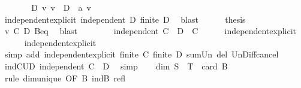 \begin{isabellebody}
\ \ \ \ \isamarkupfalse%
\ \isamarkupfalse%
\ D{}{\isacharcolon}{\kern0pt}\ {\isachardoublequoteopen}{\isasymAnd}v{\isachardot}{\kern0pt}\ v\ {\isasymin}\ D\ {\isasymLongrightarrow}\ a\ v\ {\isacharequal}{\kern0pt}\ {}{\isachardoublequoteclose}\isanewline
\ \ \ \ \ \ \isamarkupfalse%
\ independent{\isacharunderscore}{\kern0pt}explicit\ {\isacartoucheopen}independent\ D{\isacartoucheclose}\ {\isacartoucheopen}finite\ D{\isacartoucheclose}\ \isamarkupfalse%
\ blast\isanewline
\ \ \ \ \isamarkupfalse%
\ {\isacharquery}{\kern0pt}thesis\isanewline
\ \ \ \ \ \ \isamarkupfalse%
\ v\ C{}\ D{}\ Beq\ \isamarkupfalse%
\ blast\isanewline
\ \ \isamarkupfalse%
\isanewline
\ \ \isamarkupfalse%
\ \isamarkupfalse%
\ {\isachardoublequoteopen}independent\ {\isacharparenleft}{\kern0pt}C\ {\isasymunion}\ {\isacharparenleft}{\kern0pt}D\ {\isacharminus}{\kern0pt}\ C{\isacharparenright}{\kern0pt}{\isacharparenright}{\kern0pt}{\isachardoublequoteclose}\isanewline
\ \ \ \ \isamarkupfalse%
\ independent{\isacharunderscore}{\kern0pt}explicit\isanewline
\ \ \ \ \isamarkupfalse%
\ independent{\isacharunderscore}{\kern0pt}explicit\isanewline
\ \ \ \ \isamarkupfalse%
\ {\isacharparenleft}{\kern0pt}simp\ add{\isacharcolon}{\kern0pt}\ independent{\isacharunderscore}{\kern0pt}explicit\ {\isacartoucheopen}finite\ C{\isacartoucheclose}\ {\isacartoucheopen}finite\ D{\isacartoucheclose}\ sum{\isacharunderscore}{\kern0pt}Un\ del{\isacharcolon}{\kern0pt}\ Un{\isacharunderscore}{\kern0pt}Diff{\isacharunderscore}{\kern0pt}cancel{\isacharparenright}{\kern0pt}\isanewline
\ \ \isamarkupfalse%
\ \isamarkupfalse%
\ indCUD{\isacharcolon}{\kern0pt}\ {\isachardoublequoteopen}independent\ {\isacharparenleft}{\kern0pt}C\ {\isasymunion}\ D{\isacharparenright}{\kern0pt}{\isachardoublequoteclose}\ \isamarkupfalse%
\ simp\isanewline
\ \ \isamarkupfalse%
\ {\isachardoublequoteopen}dim\ {\isacharparenleft}{\kern0pt}S\ {\isasyminter}\ T{\isacharparenright}{\kern0pt}\ {\isacharequal}{\kern0pt}\ card\ B{\isachardoublequoteclose}\isanewline
\ \ \ \ \isamarkupfalse%
\ {\isacharparenleft}{\kern0pt}rule\ dim{\isacharunderscore}{\kern0pt}unique\ {\isacharbrackleft}{\kern0pt}OF\ B\ indB\ refl{\isacharbrackright}{\kern0pt}{\isacharparenright}{\kern0pt}\isanewline
\ \ \isamarkupfalse%

\end{isabellebody}
